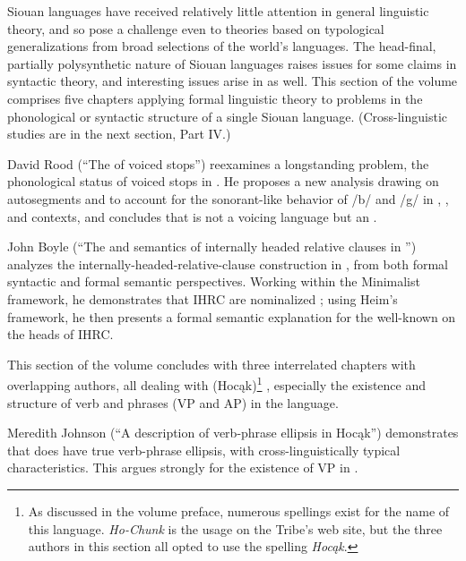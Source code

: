 \begin{refsection}

Siouan languages have received relatively little attention in general linguistic theory, and so pose a challenge even to theories based on typological generalizations from broad selections of the world's languages. The head-final, partially polysynthetic nature of Siouan languages raises issues for some claims in syntactic theory, and interesting issues arise in  as well. This section of the volume comprises five chapters applying formal linguistic theory to problems in the phonological or syntactic structure of a single Siouan language. (Cross-linguistic studies are in the next section, Part IV.)

David Rood (``The  of  voiced stops'') reexamines a longstanding problem, the phonological status of voiced stops in . He proposes a new analysis drawing on autosegments and  to account for the sonorant-like behavior of /b/ and /g/ in , , and  contexts, and concludes that  is not a voicing language but an . 

John Boyle (``The  and semantics of internally headed relative clauses in '') analyzes the internally-headed-relative-clause construction in , from both formal syntactic and formal semantic perspectives. Working within the Minimalist framework, he demonstrates that  IHRC are nominalized ; using Heim's framework, he then presents a formal semantic explanation for the well-known  on the heads of IHRC. 

This section of the volume concludes with three interrelated chapters with overlapping authors, all dealing with  (Hoc\k{a}k)\footnote{As discussed in the volume preface, numerous spellings exist for the name of this language. \textit{Ho-Chunk} is the usage on the Tribe's web site, but the three authors in this section all opted to use the spelling \textit{Hoc\k{a}k}.} , especially the existence and structure of verb and  phrases (VP and AP) in the language.

Meredith Johnson (``A description of verb-phrase ellipsis in Hoc\k{a}k'') demonstrates that  does have true verb-phrase ellipsis, with cross-linguistically typical characteristics. This argues strongly for the existence of VP in .


\end{refsection}
